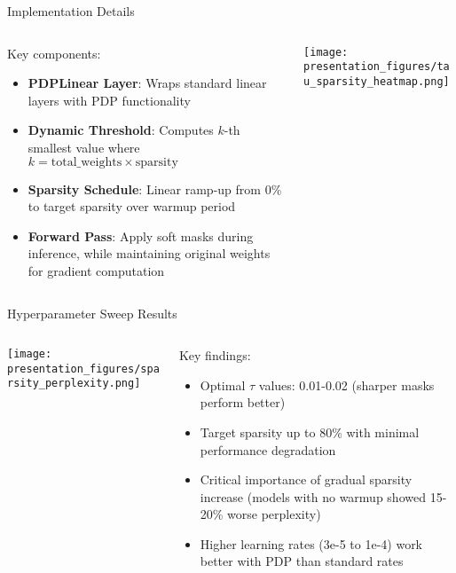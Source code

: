 \documentclass{beamer}
\begin{document}
\begin{frame}{Implementation Details}
\begin{columns}
\begin{column}{0.5\textwidth}
Key components:
\begin{itemize}
    \item \textbf{PDPLinear Layer}: Wraps standard linear layers with PDP functionality
    \item \textbf{Dynamic Threshold}: Computes $k$-th smallest value where $k = \text{total\_weights} \times \text{sparsity}$
    \item \textbf{Sparsity Schedule}: Linear ramp-up from 0\% to target sparsity over warmup period
    \item \textbf{Forward Pass}: Apply soft masks during inference, while maintaining original weights for gradient computation
\end{itemize}
\end{column}
\begin{column}{0.5\textwidth}
\begin{center}
\texttt{[image: presentation\_figures/tau\_sparsity\_heatmap.png]}
\end{center}
\end{column}
\end{columns}
\end{frame}

\begin{frame}{Hyperparameter Sweep Results}
\begin{columns}
\begin{column}{0.5\textwidth}
\begin{center}
\texttt{[image: presentation\_figures/sparsity\_perplexity.png]}
\end{center}
\end{column}
\begin{column}{0.5\textwidth}
Key findings:
\begin{itemize}
    \item Optimal $\tau$ values: 0.01-0.02 (sharper masks perform better)
    \item Target sparsity up to 80\% with minimal performance degradation
    \item Critical importance of gradual sparsity increase (models with no warmup showed 15-20\% worse perplexity)
    \item Higher learning rates (3e-5 to 1e-4) work better with PDP than standard rates
\end{itemize}
\end{column}
\end{columns}
\end{frame}
\end{document}
